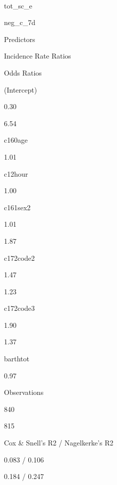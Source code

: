 \documentclass[]{article}
\begin{document}
~

tot\_sc\_e

neg\_c\_7d

Predictors

Incidence Rate Ratios

Odds Ratios

(Intercept)

0.30

6.54

c160age

1.01

c12hour

1.00

c161sex2

1.01

1.87

c172code2

1.47

1.23

c172code3

1.90

1.37

barthtot

0.97

Observations

840

815

Cox \& Snell's R2 / Nagelkerke's R2

0.083 / 0.106

0.184 / 0.247
\end{document}

